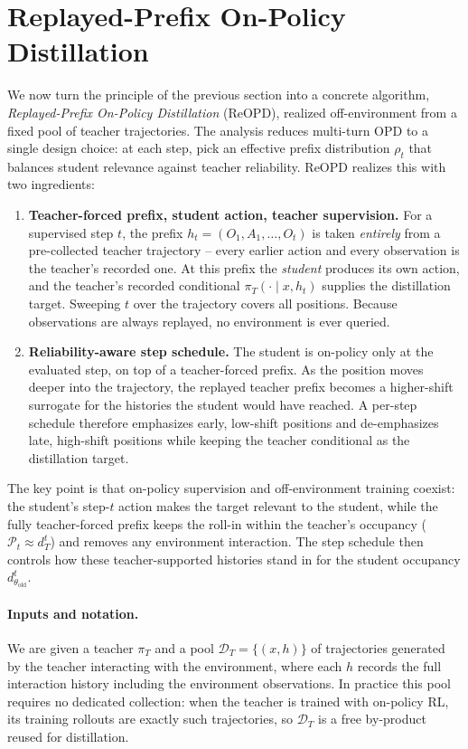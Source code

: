 \section{Replayed-Prefix On-Policy Distillation}
\label{sec:aopd}

We now turn the principle of the previous section into a concrete algorithm,
\emph{Replayed-Prefix On-Policy Distillation} (ReOPD), realized off-environment from a fixed
pool of teacher trajectories. The analysis reduces
multi-turn OPD to a single design choice: at each step, pick an effective prefix
distribution \(\rho_t\) that balances student relevance against teacher
reliability. ReOPD realizes this with two ingredients:

\begin{enumerate}[leftmargin=1.6em,itemsep=2pt,topsep=2pt]
  \item \textbf{Teacher-forced prefix, student action, teacher supervision.} For a
  supervised step \(t\), the prefix \(h_t=(O_1,A_1,\dots,O_t)\) is taken
  \emph{entirely} from a pre-collected teacher trajectory -- every earlier action
  and every observation is the teacher's recorded one. At this prefix the
  \emph{student} produces its own action, and the teacher's recorded conditional
  \(\pi_T(\cdot\mid x,h_t)\) supplies the distillation target. Sweeping \(t\) over
  the trajectory covers all positions. Because observations are always replayed,
  no environment is ever queried.
  \item \textbf{Reliability-aware step schedule.} The student is on-policy only at the
  evaluated step, on top of a teacher-forced prefix. As the position moves deeper
  into the trajectory, the replayed teacher prefix becomes a higher-shift surrogate
  for the histories the student would have reached. A per-step schedule therefore
  emphasizes early, low-shift positions and de-emphasizes late, high-shift positions
  while keeping the teacher conditional as the distillation target.
\end{enumerate}

The key point is that on-policy supervision and off-environment training coexist:
the student's step-\(t\) action makes the target relevant to the student, while the
fully teacher-forced prefix keeps the roll-in within the teacher's occupancy
(\(\mathcal P_t\approx d_T^{t}\)) and removes any environment interaction. The step schedule
then controls how these teacher-supported histories stand in for the student occupancy
\(d_{\theta_{\mathrm{old}}}^{t}\).

\paragraph{Inputs and notation.}
We are given a teacher \(\pi_T\) and a pool \(\mathcal D_T=\{(x,h)\}\) of
trajectories generated by the teacher interacting with the environment, where each
\(h\) records the full interaction history including the environment observations.
In practice this pool requires no dedicated collection: when the teacher is trained
with on-policy RL, its training rollouts are exactly such trajectories, so
\(\mathcal D_T\) is a free by-product reused for distillation.

